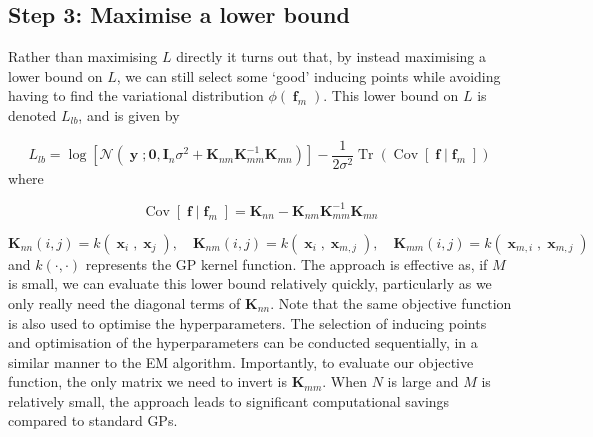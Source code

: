 \documentclass[a4paper, 11pt]{article}
\DeclareMathOperator{\Cov}{Cov}
\DeclareMathOperator{\Tr}{Tr}
\DeclareMathOperator{\x}{\boldsymbol{x}}
\DeclareMathOperator{\y}{\boldsymbol{y}}
\DeclareMathOperator{\f}{\boldsymbol{f}}
\begin{document}
\begin{framed}
\subsection*{Step 3: Maximise a lower bound}
Rather than maximising $L$ directly it turns out that, by instead maximising a lower bound on $L$, we can still select some `good' inducing points while avoiding having to find the variational distribution $\phi(\f_m)$. This lower bound on $L$ is denoted $L_{lb}$, and is given by

\begin{equation}
L_{lb} = \log\left[ \mathcal{N}(\y; \boldsymbol{0}, \boldsymbol{I}_n\sigma^2 + \boldsymbol{K}_{nm}\boldsymbol{K}_{mm}^{-1}\boldsymbol{K}_{mn})\right] -\frac{1}{2\sigma^2} \Tr\left(  \Cov[\f|\f_m] \right)
\end{equation}
where

\begin{equation}
\Cov[\f|\f_m] = \boldsymbol{K}_{nn} - \boldsymbol{K}_{nm}\boldsymbol{K}_{mm}^{-1}\boldsymbol{K}_{mn}
\end{equation}

\begin{equation}
	\boldsymbol{K}_{nn}(i,j) = k(\x_i,\x_j), \quad \boldsymbol{K}_{nm}(i,j) = k(\x_i,\x_{m,j}), \quad \boldsymbol{K}_{mm}(i,j) = k(\x_{m,i},\x_{m,j})	
\end{equation}
and $k(\cdot,\cdot)$ represents the GP kernel function. The approach is effective as, if $M$ is small, we can evaluate this lower bound relatively quickly, particularly as we only really need the diagonal terms of $\boldsymbol{K}_{nn}$. Note that the same objective function is also used to optimise the hyperparameters. The selection of inducing points and optimisation of the hyperparameters can be conducted sequentially, in a similar manner to the EM algorithm. Importantly, to evaluate our objective function, the only matrix we need to invert is $\boldsymbol{K}_{mm}$. When $N$ is large and $M$ is relatively small, the approach leads to significant computational savings compared to standard GPs.  
\end{framed}

\end{document}

